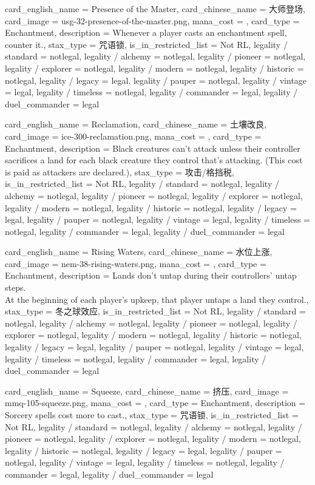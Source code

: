 \documentclass[lang = cn, color = black, 10pt]{AllThatStax}
\begin{document}
\card
{
	card_english_name = {Presence of the Master},
	card_chinese_name = {大师登场},
	card_image = usg-32-presence-of-the-master.png,
	mana_cost = ,
	card_type = Enchantment,
	description = {Whenever a player casts an enchantment spell, counter it.},
	stax_type = 咒语锁,
	is_in_restricted_list = Not RL,
	legality / standard = notlegal,
	legality / alchemy = notlegal,
	legality / pioneer = notlegal,
	legality / explorer = notlegal,
	legality / modern = notlegal,
	legality / historic = notlegal,
	legality / legacy = legal,
	legality / pauper = notlegal,
	legality / vintage = legal,
	legality / timeless = notlegal,
	legality / commander = legal,
	legality / duel_commander = legal
}

\card
{
	card_english_name = {Reclamation},
	card_chinese_name = {土壤改良},
	card_image = ice-300-reclamation.png,
	mana_cost = ,
	card_type = Enchantment,
	description = {Black creatures can't attack unless their controller sacrifices a land for each black creature they control that's attacking. (This cost is paid as attackers are declared.)},
	stax_type = 攻击/格挡税,
	is_in_restricted_list = Not RL,
	legality / standard = notlegal,
	legality / alchemy = notlegal,
	legality / pioneer = notlegal,
	legality / explorer = notlegal,
	legality / modern = notlegal,
	legality / historic = notlegal,
	legality / legacy = legal,
	legality / pauper = notlegal,
	legality / vintage = legal,
	legality / timeless = notlegal,
	legality / commander = legal,
	legality / duel_commander = legal
}

\card
{
	card_english_name = {Rising Waters},
	card_chinese_name = {水位上涨},
	card_image = nem-38-rising-waters.png,
	mana_cost = ,
	card_type = Enchantment,
	description = {Lands don't untap during their controllers' untap steps.\\
		At the beginning of each player's upkeep, that player untaps a land they control.},
	stax_type = 冬之球效应,
	is_in_restricted_list = Not RL,
	legality / standard = notlegal,
	legality / alchemy = notlegal,
	legality / pioneer = notlegal,
	legality / explorer = notlegal,
	legality / modern = notlegal,
	legality / historic = notlegal,
	legality / legacy = legal,
	legality / pauper = notlegal,
	legality / vintage = legal,
	legality / timeless = notlegal,
	legality / commander = legal,
	legality / duel_commander = legal
}

\card
{
	card_english_name = {Squeeze},
	card_chinese_name = {挤压},
	card_image = mmq-105-squeeze.png,
	mana_cost = ,
	card_type = Enchantment,
	description = {Sorcery spells cost  more to cast.},
	stax_type = 咒语锁,
	is_in_restricted_list = Not RL,
	legality / standard = notlegal,
	legality / alchemy = notlegal,
	legality / pioneer = notlegal,
	legality / explorer = notlegal,
	legality / modern = notlegal,
	legality / historic = notlegal,
	legality / legacy = legal,
	legality / pauper = notlegal,
	legality / vintage = legal,
	legality / timeless = notlegal,
	legality / commander = legal,
	legality / duel_commander = legal
}
\end{document}
